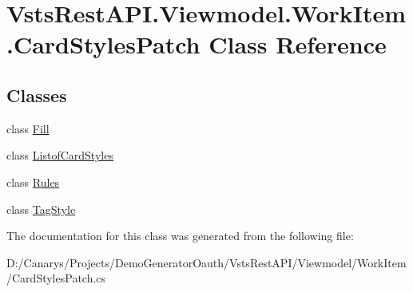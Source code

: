 \hypertarget{class_vsts_rest_a_p_i_1_1_viewmodel_1_1_work_item_1_1_card_styles_patch}{}\section{Vsts\+Rest\+A\+P\+I.\+Viewmodel.\+Work\+Item.\+Card\+Styles\+Patch Class Reference}
\label{class_vsts_rest_a_p_i_1_1_viewmodel_1_1_work_item_1_1_card_styles_patch}
\subsection*{Classes}
\begin{DoxyCompactItemize}
\item 
class \mbox{\hyperlink{class_vsts_rest_a_p_i_1_1_viewmodel_1_1_work_item_1_1_card_styles_patch_1_1_fill}{Fill}}
\item 
class \mbox{\hyperlink{class_vsts_rest_a_p_i_1_1_viewmodel_1_1_work_item_1_1_card_styles_patch_1_1_listof_card_styles}{Listof\+Card\+Styles}}
\item 
class \mbox{\hyperlink{class_vsts_rest_a_p_i_1_1_viewmodel_1_1_work_item_1_1_card_styles_patch_1_1_rules}{Rules}}
\item 
class \mbox{\hyperlink{class_vsts_rest_a_p_i_1_1_viewmodel_1_1_work_item_1_1_card_styles_patch_1_1_tag_style}{Tag\+Style}}
\end{DoxyCompactItemize}


The documentation for this class was generated from the following file\+:\begin{DoxyCompactItemize}
\item 
D\+:/\+Canarys/\+Projects/\+Demo\+Generator\+Oauth/\+Vsts\+Rest\+A\+P\+I/\+Viewmodel/\+Work\+Item/Card\+Styles\+Patch.\+cs\end{DoxyCompactItemize}
